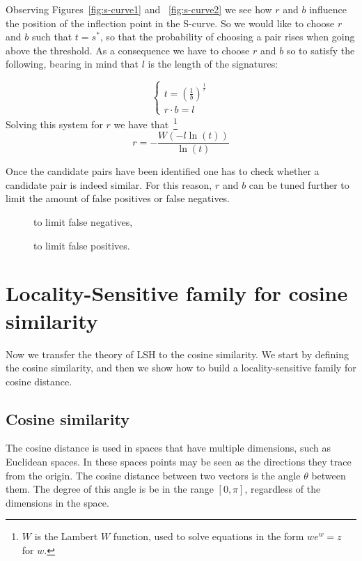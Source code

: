 Observing Figures~\ref{fig:s-curve1} and ~\ref{fig:s-curve2} we see how $r$ and $b$ influence the position of the inflection point in the S-curve. So we would like to choose $r$ and $b$ such that $t=s^*$, so that the probability of choosing a pair rises when going above the threshold. As a consequence we have to choose $r$ and $b$ so to satisfy the following, bearing in mind that $l$ is the length of the signatures:   

\begin{equation*}
    \begin{cases}
        t=\left(\frac{1}{b}\right)^\frac{1}{r} \\
        r\cdot b = l
    \end{cases}
\end{equation*}
Solving this system for $r$ we have that~\footnote{$W$ is the Lambert $W$ function, used to solve equations in the form $we^{w}=z$ for $w$.}
\begin{equation*}
    r=-\frac{W(-l\ln(t))}{\ln(t)}
\end{equation*}

Once the candidate pairs have been identified one has to check whether a candidate pair is indeed similar. For this reason, $r$ and $b$ can be tuned further to limit the amount of false positives or false negatives.
\begin{description}
    \item [] to limit false negatives,
    \item [] to limit false positives.
\end{description}

\section{Locality-Sensitive family for cosine similarity}\label{LSfamily:cosine}
Now we transfer the theory of LSH to the cosine similarity. We start by defining the cosine similarity, and then we show how to build a locality-sensitive family for cosine distance.

\subsection{Cosine similarity}\label{cosineSimilarity}
The cosine distance is used in spaces that have multiple dimensions, such as Euclidean spaces. In these spaces points may be seen as the directions they trace from the origin. The cosine distance between two vectors is the angle $\theta$ between them. The degree of this angle is be in the range $[0,\pi]$, regardless of the dimensions in the space. 

